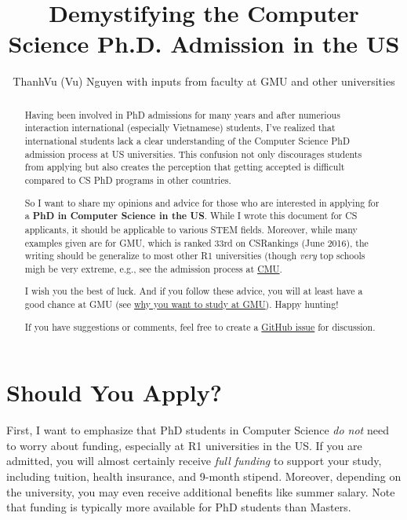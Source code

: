 \documentclass[10pt]{article}
\title{Demystifying the Computer Science Ph.D. Admission in the US}
\date{}
\author{ThanhVu (Vu) Nguyen with inputs from faculty at GMU and other universities}
\begin{document}
\maketitle

\begin{abstract}
Having been involved in PhD admissions for many years and after
numerious interaction international (especially Vietnamese) students, I've
realized that international students lack a clear understanding of
the Computer Science PhD admission process at US universities. This confusion not only
discourages students from applying but also creates the perception that
getting accepted is difficult compared to CS PhD programs in other countries.

So I want to share my opinions and advice for those who are interested in applying for a \textbf{PhD in Computer Science in the US}.
While I wrote this document for CS applicants, it should be applicable to various STEM fields.
Moreover, while many examples given are for GMU, which is ranked 33rd on CSRankings (June 2016), the writing should be generalize to most other R1 universities  (though \emph{very} top schools migh be very extreme, e.g., see the admission process at \href{https://da-data.blogspot.com/2015/03/reflecting-on-cs-graduate-admissions.html}{CMU}.

I wish you the best of luck. And if you follow these advice,
you will at least have a good chance at GMU (see
\href{https://github.com/dynaroars/dynaroars.github.io/wiki/About-GMU}{why
you want to study at GMU}). Happy hunting!

If you have suggestions or comments, feel free to create a \href{https://github.com/dynaroars/dynaroars.github.io/issues}{GitHub issue} for discussion.
\end{abstract}

\section{Should You Apply?}


First, I want to emphasize that PhD students in Computer
Science \emph{do not} need to worry about funding, especially at R1
universities in the US. If you are admitted, you will almost certainly
receive \emph{full funding} to support your study, including tuition,
health insurance, and 9-month stipend. Moreover, depending on the university,
you may even receive additional benefits like summer salary. Note that
funding is typically more available for PhD students than 
Masters. %
\end{document}
